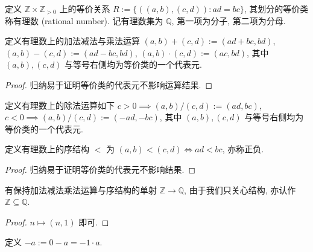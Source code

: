 \begin{definition}
    定义 \(\mathbb{Z} \times \mathbb{Z}_{> 0}\) 上的等价关系 \(R := \{((a,b),(c,d)) : ad = bc\}\), 其划分的等价类称有理数 (rational number). 记有理数集为 \(\mathbb{Q}\),
    第一项为分子, 第二项为分母.
\end{definition}

\begin{definition}
    定义有理数上的加法减法与乘法运算 \((a,b) + (c,d) := (ad + bc, bd)\), \((a,b) - (c,d) := (ad - bc, bd)\), \((a,b) \cdot (c,d) := (ac, bd)\), 其中 \((a,b),(c,d)\) 与等号右侧均为等价类的一个代表元.

    \begin{proof}
        归纳易于证明等价类的代表元不影响运算结果.
    \end{proof}
\end{definition}

\begin{definition}
    定义有理数上的除法运算如下 \(c > 0 \implies (a,b) / (c,d) := (ad, bc)\), \(c < 0 \implies (a,b) / (c,d) := (-ad, -bc)\), 其中 \((a,b),(c,d)\) 与等号右侧均为等价类的一个代表元.
\end{definition}

\begin{definition}
    定义有理数上的序结构 \(<\) 为 \((a,b) < (c,d) \iff ad < bc\), 亦称正负.

    \begin{proof}
        归纳易于证明等价类的代表元不影响结果.
    \end{proof}
\end{definition}

\begin{lemma}
    有保持加法减法乘法运算与序结构的单射 \(\mathbb{Z} \to \mathbb{Q}\), 由于我们只关心结构, 亦认作 \(\mathbb{Z} \subseteq \mathbb{Q}\).

    \begin{proof}
        \(n \mapsto (n,1)\) 即可.
    \end{proof}
\end{lemma}

\begin{definition}
    定义 \(-a := 0 - a = -1 \cdot a\).
\end{definition}


